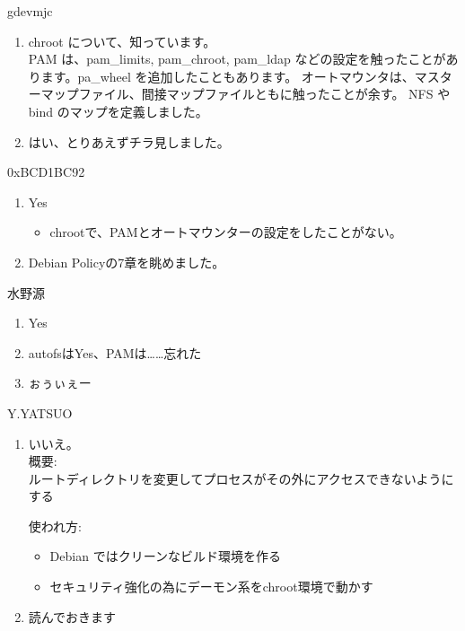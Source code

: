 \documentclass[mingoth,a4paper]{jsarticle}
\begin{document}
\begin{prework}{ gdevmjc }
 \begin{enumerate}
  \item chroot について、知っています。\\
        PAM は、pam\_limits, pam\_chroot, pam\_ldap などの設定を触ったことがあります。pa\_wheel を追加したこともあります。
        オートマウンタは、マスターマップファイル、間接マップファイルともに触ったことが余す。 NFS や bind のマップを定義しました。
  \item はい、とりあえずチラ見しました。
 \end{enumerate}
\end{prework}

\begin{prework}{ 0xBCD1BC92 }

 \begin{enumerate}
  \item Yes 
        \begin{itemize}
         \item chrootで、PAMとオートマウンターの設定をしたことがない。 
        \end{itemize}
  \item Debian Policyの7章を眺めました。
 \end{enumerate}
\end{prework}

\begin{prework}{ 水野源 }
 \begin{enumerate}
  \item Yes
  \item autofsはYes、PAMは……忘れた
  \item ぉぅぃぇー
 \end{enumerate}
\end{prework}

\begin{prework}{ Y.YATSUO }
 \begin{enumerate}
  \item いいえ。 \\
        概要: \\
        ルートディレクトリを変更してプロセスがその外にアクセスできないようにする
       
        使われ方:
        \begin{itemize}
         \item Debian ではクリーンなビルド環境を作る
         \item セキュリティ強化の為にデーモン系をchroot環境で動かす 
        \end{itemize}
  \item 読んでおきます
 \end{enumerate}
\end{prework}
\end{document}
